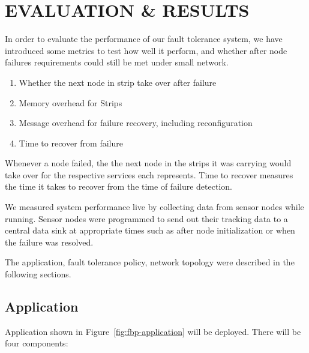 \cleardoublepage
\singlespacing
\chapter{EVALUATION \& RESULTS}
\label{c:evaluation}
\doublespacing\nointerlineskip


In order to evaluate the performance of our fault tolerance system, we have
introduced some metrics to test how well it perform, and whether after node
failures requirements could still be met under small network.

\begin{enumerate}
\item Whether the next node in strip take over after failure
\item Memory overhead for Strips
\item Message overhead for failure recovery, including reconfiguration
\item Time to recover from failure
\end{enumerate}

Whenever a node failed, the the next node in the strips it was carrying would
take over for the respective services each represents.
Time to recover measures the time it takes to recover from the time of failure
detection.

We measured system performance live by collecting data from sensor nodes while
running. Sensor nodes were programmed to send out their tracking data to
a central data sink at appropriate times such as after node initialization or
when the failure was resolved.

The application, fault tolerance policy, network topology were described in the
following sections.


\section{Application}

Application shown in Figure~\ref{fig:fbp-application} will be deployed.  There
will be four components: 

